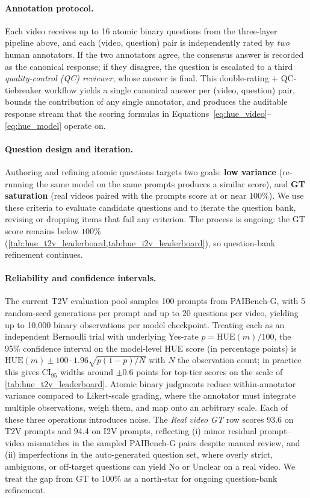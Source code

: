 \paragraph{Annotation protocol.} Each video receives up to 16 atomic binary questions from the three-layer pipeline above, and each (video, question) pair is independently rated by \emph{two} human annotators. If the two annotators agree, the consensus answer is recorded as the canonical response; if they disagree, the question is escalated to a third \emph{quality-control (QC) reviewer}, whose answer is final. This double-rating + QC-tiebreaker workflow yields a single canonical answer per (video, question) pair, bounds the contribution of any single annotator, and produces the auditable response stream that the scoring formulas in Equations~\ref{eq:hue_video}--\ref{eq:hue_model} operate on.

\paragraph{Question design and iteration.} Authoring and refining atomic questions targets two goals: \textbf{low variance} (re-running the same model on the same prompts produces a similar score), and \textbf{GT saturation} (real videos paired with the prompts score at or near $100\%$). We use these criteria to evaluate candidate questions and to iterate the question bank, revising or dropping items that fail any criterion. The process is ongoing: the GT score remains below $100\%$ (\cref{tab:hue_t2v_leaderboard,tab:hue_i2v_leaderboard}), so question-bank refinement continues.

\paragraph{Reliability and confidence intervals.} The current T2V evaluation pool samples 100 prompts from PAIBench-G, with 5 random-seed generations per prompt and up to 20 questions
per video, yielding up to 10{,}000 binary observations per model checkpoint. Treating each as an independent Bernoulli trial with underlying Yes-rate $p = \mathrm{HUE}(m)/100$, the
95\% confidence interval on the model-level HUE score (in percentage points) is $\mathrm{HUE}(m) \pm 100 \cdot 1.96\sqrt{p(1-p)/N}$ with $N$ the observation count; in practice this
gives CI$_{95}$ widths around $\pm 0.6$ points for top-tier scores on the scale of \cref{tab:hue_t2v_leaderboard}. Atomic binary judgments reduce within-annotator variance compared to
Likert-scale grading, where the annotator must integrate multiple observations, weigh them, and map onto an arbitrary scale. Each of these three operations introduces noise. The
\emph{Real video GT} row scores 93.6 on T2V prompts and 94.4 on I2V prompts, reflecting (i) minor residual prompt--video mismatches in the sampled PAIBench-G pairs despite manual
review, and (ii) imperfections in the auto-generated question set, where overly strict, ambiguous, or off-target questions can yield No or Unclear on a real video. We treat the gap
from GT to $100\%$ as a north-star for ongoing question-bank refinement.

